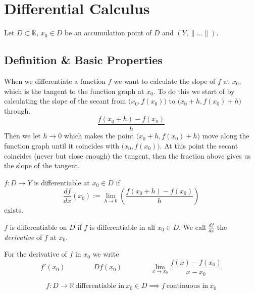\newpage

\section{Differential Calculus}
Let \(D \subset \mathbb{K}\), \(x_0 \in D\) be an accumulation point of \(D\) and \((Y, \|\ldots\|)\).

\subsection{Definition \& Basic Properties}
When we differentiate a function \(f\) we want to calculate the slope of \(f\) at \(x_0\), which is the tangent to the function graph at \(x_0\).
To do this we start of by calculating the slope of the secant from \(\big(x_0, f(x_0)\big)\) to \(\big(x_0 + h, f(x_0) + h\big)\) through.
\[\frac{f(x_0 + h) - f(x_0)}{h}\]
Then we let \(h \to 0\) which makes the point \(\big(x_0 + h, f(x_0) + h\big)\) move along the function graph until it coincides with \(\big(x_0, f(x_0)\big)\).
At this point the secant coincides (never but close enough) the tangent, then the fraction above gives us the slope of the tangent.
\begin{center}
   
\end{center}

\begin{definition}
   \(f: D \to Y\) is differentiable at \(x_0 \in D\) if
   \[\frac{df}{dx}(x_0) := \lim_{h \to 0}\left(\frac{f(x_0 + h) - f(x_0)}{h}\right)\]
   exists.
\end{definition}
\begin{remark}[Terminology]
   \(f\) is differentiable on \(D\) if \(f\) is differentiable in all \(x_0 \in D\).
   We call \(\frac{df}{dx}\) the \emph{derivative} of \(f\) at \(x_0\).
\end{remark}
\begin{remark}[Notation]
   For the derivative of \(f\) in \(x_0\) we write
   \[f'(x_0) \qquad\qquad Df(x_0) \qquad\qquad \lim_{x \to x_0} \frac{f(x) - f(x_0)}{x - x_0}\]
\end{remark}

\begin{proposition}\label{pro:deri_impl_cont}
   \[f: D \to \mathbb{R}~\text{differentiable in}~x_0 \in D \implies f~\text{continuous in}~x_0\]
\end{proposition}

